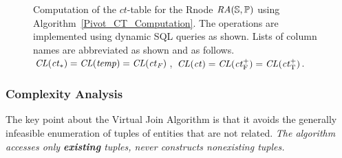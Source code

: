 \documentclass{vldb}
\newcommand{\ct}{\mathit{ct}}
\begin{document}
\begin{figure}[tb]
\begin{center}
\caption{Computation of the $\ct$-table for the Rnode $\mathit{RA}(\mathbb{S},\mathbb{P})$ using Algorithm~\ref{Pivot_CT_Computation}. The operations are implemented using dynamic SQL queries as shown. Lists of column names are abbreviated as shown and as follows.
$\ColumnList({\ct_{*}}) = \ColumnList({temp})=\ColumnList({\ct_{F}})$, 
$\ColumnList({\ct}) =  \ColumnList(\ct_{\false}^{+})  = \ColumnList(\ct_{\true}^{+}) $.
\label{fig:flow}}
\end{center}
\end{figure}








\subsubsection{Complexity Analysis} 

The key point about the Virtual Join Algorithm %
is that it avoids the generally infeasible enumeration of tuples of entities that are not related.
{\em The algorithm accesses  only \textbf{existing} tuples, never constructs nonexisting tuples.}
\end{document}
